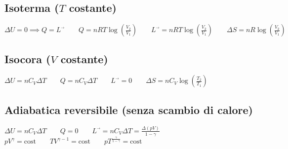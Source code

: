 \documentclass[a4paper,NoNotes,GeneralMath,12pt]{stdmdoc}
\begin{document}
	\subsection*{Isoterma ($T$ costante)}
	$\Delta U = 0 \implies Q = L^{\vec{}} \qquad Q = nRT \log \left( \frac{V_2}{V_1} \right) \qquad L^{\vec{}} = nRT \log \left( \frac{V_2}{V_1} \right) \qquad \Delta S = nR \log \left( \frac{V_2}{V_1} \right) $

	\subsection*{Isocora ($V$ costante)}
	$\Delta U = n C_V \Delta T \qquad Q = n C_V \Delta T \qquad L^{\vec{}} = 0 \qquad \Delta S = n C_V \log \left( \frac{T_2}{T_1} \right)$

	\subsection*{Adiabatica reversibile (senza scambio di calore)}
	$\Delta U = n C_V \Delta T \qquad Q = 0 \qquad L^{\vec{}} = n C_V \Delta T = \frac{\Delta (pV)}{1 - \gamma}$ \\ $pV^\gamma = \text{cost} \qquad TV^{\gamma -1} = \text{cost} \qquad pT^{\frac{\gamma}{1-\gamma}} = \text{cost}$
\end{document}
